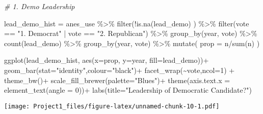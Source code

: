 \documentclass[
]{article}
\newenvironment{Shaded}{\begin{snugshade}}{\end{snugshade}}
\newcommand{\AttributeTok}[1]{\textcolor[rgb]{0.77,0.63,0.00}{#1}}
\newcommand{\CommentTok}[1]{\textcolor[rgb]{0.56,0.35,0.01}{\textit{#1}}}
\newcommand{\DecValTok}[1]{\textcolor[rgb]{0.00,0.00,0.81}{#1}}
\newcommand{\FunctionTok}[1]{\textcolor[rgb]{0.00,0.00,0.00}{#1}}
\newcommand{\NormalTok}[1]{#1}
\newcommand{\OtherTok}[1]{\textcolor[rgb]{0.56,0.35,0.01}{#1}}
\newcommand{\SpecialCharTok}[1]{\textcolor[rgb]{0.00,0.00,0.00}{#1}}
\newcommand{\StringTok}[1]{\textcolor[rgb]{0.31,0.60,0.02}{#1}}
\begin{document}
\begin{Shaded}
\begin{Highlighting}[]
\CommentTok{\# 1. Demo Leadership}

\NormalTok{lead\_demo\_hist }\OtherTok{=}\NormalTok{ anes\_use }\SpecialCharTok{\%\textgreater{}\%}
  \FunctionTok{filter}\NormalTok{(}\SpecialCharTok{!}\FunctionTok{is.na}\NormalTok{(lead\_demo) ) }\SpecialCharTok{\%\textgreater{}\%}
  \FunctionTok{filter}\NormalTok{(vote }\SpecialCharTok{==} \StringTok{"1. Democrat"} \SpecialCharTok{|}\NormalTok{ vote }\SpecialCharTok{==} \StringTok{"2. Republican"}\NormalTok{) }\SpecialCharTok{\%\textgreater{}\%}
  \FunctionTok{group\_by}\NormalTok{(year, vote) }\SpecialCharTok{\%\textgreater{}\%}
  \FunctionTok{count}\NormalTok{(lead\_demo) }\SpecialCharTok{\%\textgreater{}\%}
  \FunctionTok{group\_by}\NormalTok{(year, vote) }\SpecialCharTok{\%\textgreater{}\%}
  \FunctionTok{mutate}\NormalTok{(}
    \AttributeTok{prop =}\NormalTok{ n}\SpecialCharTok{/}\FunctionTok{sum}\NormalTok{(n)}
\NormalTok{  )}

\FunctionTok{ggplot}\NormalTok{(lead\_demo\_hist,}
       \FunctionTok{aes}\NormalTok{(}\AttributeTok{x=}\NormalTok{prop, }\AttributeTok{y=}\NormalTok{year, }\AttributeTok{fill=}\NormalTok{lead\_demo))}\SpecialCharTok{+}
  \FunctionTok{geom\_bar}\NormalTok{(}\AttributeTok{stat=}\StringTok{"identity"}\NormalTok{,}\AttributeTok{colour=}\StringTok{"black"}\NormalTok{)}\SpecialCharTok{+}
  \FunctionTok{facet\_wrap}\NormalTok{(}\SpecialCharTok{\textasciitilde{}}\NormalTok{vote,}\AttributeTok{ncol=}\DecValTok{1}\NormalTok{) }\SpecialCharTok{+}
  \FunctionTok{theme\_bw}\NormalTok{()}\SpecialCharTok{+}
  \FunctionTok{scale\_fill\_brewer}\NormalTok{(}\AttributeTok{palette=}\StringTok{"Blues"}\NormalTok{)}\SpecialCharTok{+}
  \FunctionTok{theme}\NormalTok{(}\AttributeTok{axis.text.x =} \FunctionTok{element\_text}\NormalTok{(}\AttributeTok{angle =} \DecValTok{0}\NormalTok{))}\SpecialCharTok{+}
  \FunctionTok{labs}\NormalTok{(}\AttributeTok{title=}\StringTok{"Leadership of Democratic Candidate?"}\NormalTok{)}
\end{Highlighting}
\end{Shaded}

\texttt{[image: Project1\_files/figure-latex/unnamed-chunk-10-1.pdf]}
\end{document}
